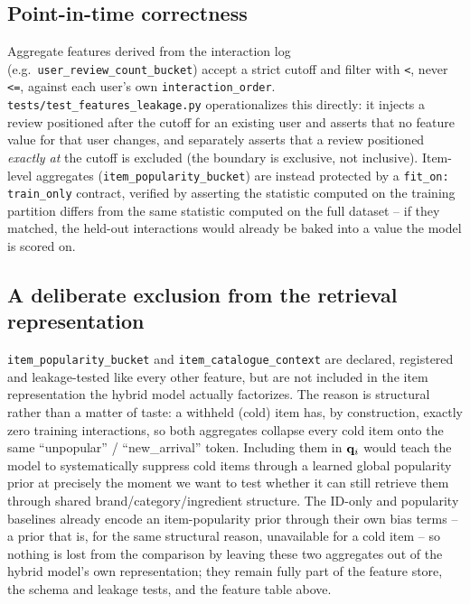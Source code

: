 

\begin{table}[h]
  \centering
  \caption{Per-feature rationale, generated from the \texttt{rationale}
  field every entry in \texttt{conf/features.yaml} is required to carry
  (\texttt{test\_features\_schema.py} rejects a feature without one).}
  \label{tab:feature-rationale}
  
\end{table}

\subsection{Point-in-time correctness}

Aggregate features derived from the interaction log (e.g.\
\texttt{user\_review\_count\_bucket}) accept a strict cutoff and filter with
\texttt{<}, never \texttt{<=}, against each user's own
\texttt{interaction\_order}. \texttt{tests/test\_features\_leakage.py}
operationalizes this directly: it injects a review positioned after the
cutoff for an existing user and asserts that no feature value for that user
changes, and separately asserts that a review positioned \emph{exactly at}
the cutoff is excluded (the boundary is exclusive, not inclusive). Item-level
aggregates (\texttt{item\_popularity\_bucket}) are instead protected by a
\texttt{fit\_on: train\_only} contract, verified by asserting the statistic
computed on the training partition differs from the same statistic computed
on the full dataset -- if they matched, the held-out interactions would
already be baked into a value the model is scored on.

\subsection{A deliberate exclusion from the retrieval representation}

\texttt{item\_popularity\_bucket} and \texttt{item\_catalogue\_context} are
declared, registered and leakage-tested like every other feature, but are
not included in the item representation the hybrid model actually
factorizes. The reason is structural rather than a matter of taste: a
withheld (cold) item has, by construction, exactly zero training
interactions, so both aggregates collapse every cold item onto the same
``unpopular'' / ``new\_arrival'' token. Including them in $\mathbf{q}_i$ would
teach the model to systematically suppress cold items through a learned
global popularity prior at precisely the moment we want to test whether it
can still retrieve them through shared brand/category/ingredient structure.
The ID-only and popularity baselines already encode an item-popularity prior
through their own bias terms -- a prior that is, for the same structural
reason, unavailable for a cold item -- so nothing is lost from the
comparison by leaving these two aggregates out of the hybrid model's own
representation; they remain fully part of the feature store, the schema and
leakage tests, and the feature table above.

